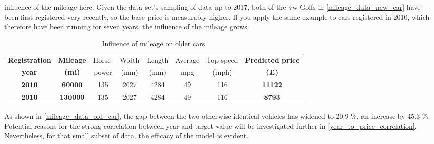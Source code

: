 influence of the mileage here.
Given the data set's sampling of data up to 2017, both of the \ac{vw} Golfs in \autoref{mileage_data_new_car} have been first registered very recently, so the base price is measurably higher.
If you apply the same example to cars registered in 2010, which therefore have been running for seven years, the influence of the mileage grows.
\begin{table}[H]
    \begin{adjustbox}{width={\textwidth}}
        \begin{tabular}{|c|c|c|c|c|c|c|c|}
            \hline
            \textbf{Registration} & \textbf{Mileage} & Horse- & Width & Length & Average & Top speed & \textbf{Predicted price} \\[-1ex]
            \textbf{year}         & \textbf{(mi)}    & power  & (mm)  & (mm)   & mpg     & (mph)     & \textbf{(£)}             \\ \hline
            \textbf{2010}         & \textbf{60000}   & 135    & 2027  & 4284   & 49      & 116       & \textbf{11122}           \\\hline
            \textbf{2010}         & \textbf{130000}  & 135    & 2027  & 4284   & 49      & 116       & \textbf{8793}            \\\hline
        \end{tabular}
    \end{adjustbox}
    \caption{Influence of mileage on older cars}
    \label{mileage_data_old_car}
\end{table}
As shown in \autoref{mileage_data_old_car}, the gap between the two otherwise identical vehicles has widened to 20.9 \%, an increase by 45.3 \%.
Potential reasons for the strong correlation between year and target value will be investigated further in \autoref{year_to_price_correlation}.
Nevertheless, for that small subset of data, the efficacy of the model is evident.
